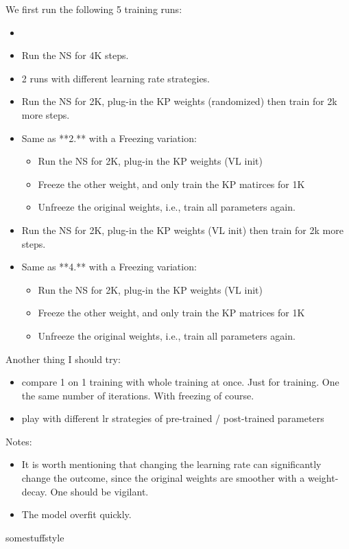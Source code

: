 \documentclass{article}
\begin{document}
{We first run the following 5 training runs:
\begin{itemize}
	\item 
	\item  Run the NS for 4K steps.
	\item  2 runs with different learning rate strategies.
	\item  Run the NS for 2K, plug-in the KP weights (randomized) then train for 2k more steps.
	\item  Same as **2.** with a Freezing variation:
	\begin{itemize}
		\item     Run the NS for 2K, plug-in the KP weights (VL init) 
		\item     Freeze the other weight, and only train the KP matirces for 1K
		\item     Unfreeze the original weights, i.e., train all parameters again. 
	\end{itemize}
	\item  Run the NS for 2K, plug-in the KP weights (VL init) then train for 2k more steps.
	\item  Same as **4.** with a Freezing variation:
	\begin{itemize}
		\item     Run the NS for 2K, plug-in the KP weights (VL init) 
		\item     Freeze the other weight, and only train the KP matrices for 1K
		\item     Unfreeze the original weights, i.e., train all parameters again. 
	\end{itemize}
\end{itemize}

Another thing I should try:
\begin{itemize}
	\item compare 1 on 1 training with whole training at once.  Just for training. One the same number of iterations. With freezing of course.
	\item play with different lr strategies of pre-trained / post-trained parameters

\end{itemize}

Notes: 
\begin{itemize}
	\item  It is worth mentioning that changing the learning rate can significantly change the outcome, since the original weights are smoother with a weight-decay. One should be vigilant.
	\item  The model overfit quickly.
\end{itemize}
somestuffstyle


}
\end{document}
